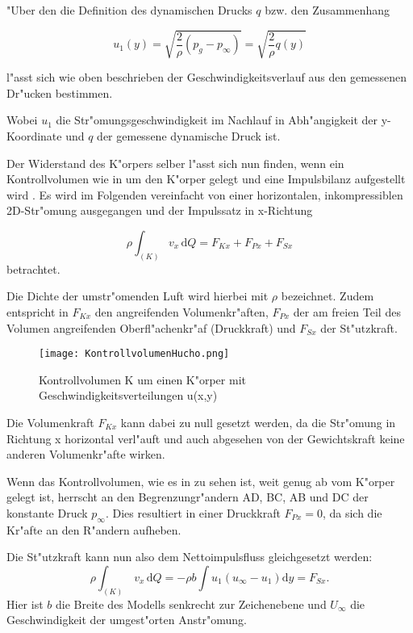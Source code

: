 "Uber den die Definition des dynamischen Drucks $q$ bzw. den Zusammenhang
\begin{center}
	\begin{equation}
		\label{geschwindigkeitsformel}
		u_{1}(y)= \sqrt{\frac{2}{\rho}(p_g - p_{\infty}) } = \sqrt{\frac{2}{\rho} q(y)}
	\end{equation}
\end{center}
l"asst sich wie oben beschrieben der Geschwindigkeitsverlauf aus den gemessenen Dr"ucken bestimmen.

Wobei $u_{1}$ die Str"omungsgeschwindigkeit im Nachlauf in Abh"angigkeit der y-Koordinate und $q$ der gemessene dynamische Druck ist.

Der Widerstand des K"orpers selber l"asst sich nun finden, wenn ein Kontrollvolumen wie in  um den K"orper gelegt und eine Impulsbilanz aufgestellt wird \cite{Hucho.2011}. Es wird im Folgenden vereinfacht von einer horizontalen, inkompressiblen 2D-Str"omung ausgegangen und der Impulssatz in x-Richtung

\begin{equation}
	\label{eq:impulssatz_allg}
	\rho \int_{(K)} v_x \, \mathrm{d}Q = F_{Kx} + F_{Px} + F_{Sx}
\end{equation}
betrachtet.

Die Dichte der umstr"omenden Luft wird hierbei mit $\rho$ bezeichnet.
Zudem entspricht in  $F_{Kx}$ den angreifenden Volumenkr"aften, $F_{Px}$ der am freien Teil des Volumen angreifenden Oberfl"achenkr"af (Druckkraft) und $F_{Sx}$ der St"utzkraft.

\begin{figure}[h]
	\centering
	\texttt{[image: KontrollvolumenHucho.png]}
	\caption{Kontrollvolumen K um einen K"orper mit Geschwindigkeitsverteilungen u(x,y)~\cite{Hucho.2011}}
	\label{fig:HuchoKV}
\end{figure}

Die Volumenkraft $F_{Kx}$ kann dabei zu null gesetzt werden, da die Str"omung in Richtung x horizontal verl"auft und auch abgesehen von der Gewichtskraft keine anderen Volumenkr"afte wirken.

Wenn das Kontrollvolumen, wie es in  zu sehen ist, weit genug ab vom K"orper gelegt ist, herrscht an den Begrenzungr"andern AD, BC, AB und DC der konstante Druck $p_{\infty}$.
Dies resultiert in einer Druckkraft $F_{Px} = 0$, da sich die Kr"afte an den R"andern aufheben.

Die St"utzkraft kann nun also dem Nettoimpulsfluss gleichgesetzt werden:
\begin{equation}
	\label{eq:nettoimpulsfluss}
	\rho \int_{(K)} \, v_x \, \mathrm{d}Q	= -\rho b \int u_1(u_{\infty} - u_1) \mathrm{d}y = F_{Sx}.	
\end{equation}
Hier ist $b$ die Breite des Modells senkrecht zur Zeichenebene und $U_{\infty}$ die Geschwindigkeit der umgest"orten Anstr"omung.

